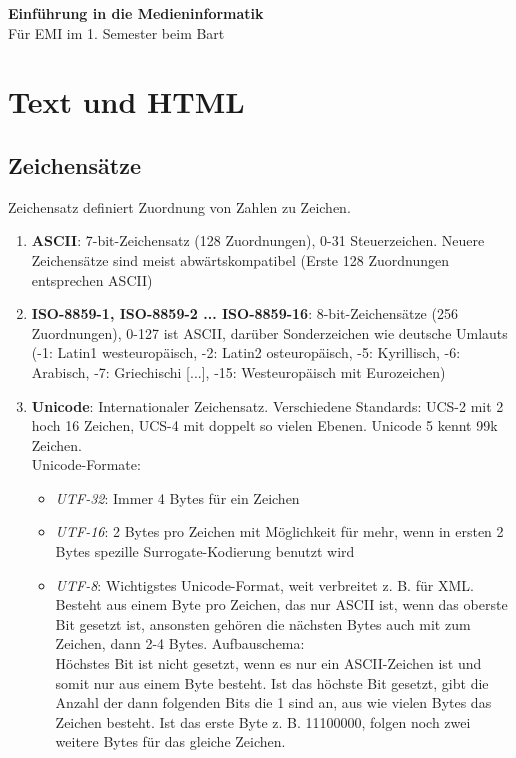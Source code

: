 \documentclass[12pt,landscape]{article}
\begin{document}
\footnotesize
\begin{multicols}{3}

\begin{center}
     \Large{\textbf{Einführung in die Medieninformatik}} \\
     \small{Für EMI im 1. Semester beim Bart}
\end{center}

\section{Text und HTML}
\subsection{Zeichensätze}
Zeichensatz definiert Zuordnung von Zahlen zu Zeichen.
\begin{enumerate}
\item \textbf{ASCII}: 7-bit-Zeichensatz (128 Zuordnungen), 0-31 Steuerzeichen. Neuere Zeichensätze sind meist abwärtskompatibel (Erste 128 Zuordnungen entsprechen ASCII)
\item \textbf{ISO-8859-1, ISO-8859-2 ... ISO-8859-16}: 8-bit-Zeichensätze (256 Zuordnungen), 0-127 ist ASCII, darüber Sonderzeichen wie deutsche Umlauts (-1: Latin1 westeuropäisch, -2: Latin2 osteuropäisch, -5: Kyrillisch, -6: Arabisch, -7: Griechischi [...], -15: Westeuropäisch mit Eurozeichen)
\item \textbf{Unicode}: Internationaler Zeichensatz. Verschiedene Standards: UCS-2 mit 2 hoch 16 Zeichen, UCS-4 mit doppelt so vielen Ebenen. Unicode 5 kennt 99k Zeichen.\\
Unicode-Formate:
\begin{itemize}
\item \textit{UTF-32}: Immer 4 Bytes für ein Zeichen
\item \textit{UTF-16}: 2 Bytes pro Zeichen mit Möglichkeit für mehr, wenn in ersten 2 Bytes spezille Surrogate-Kodierung benutzt wird
\item \textit{UTF-8}: Wichtigstes Unicode-Format, weit verbreitet z. B. für XML. Besteht aus einem Byte pro Zeichen, das nur ASCII ist, wenn das oberste Bit gesetzt ist, ansonsten gehören die nächsten Bytes auch mit zum Zeichen, dann 2-4 Bytes. Aufbauschema: \\
Höchstes Bit ist nicht gesetzt, wenn es nur ein ASCII-Zeichen ist und somit nur aus einem Byte besteht. Ist das höchste Bit gesetzt, gibt die Anzahl der dann folgenden Bits die 1 sind an, aus wie vielen Bytes das Zeichen besteht. Ist das erste Byte z. B. 11100000, folgen noch zwei weitere Bytes für das gleiche Zeichen. 
\end{itemize}
\end{enumerate}


\end{multicols}
\end{document}
